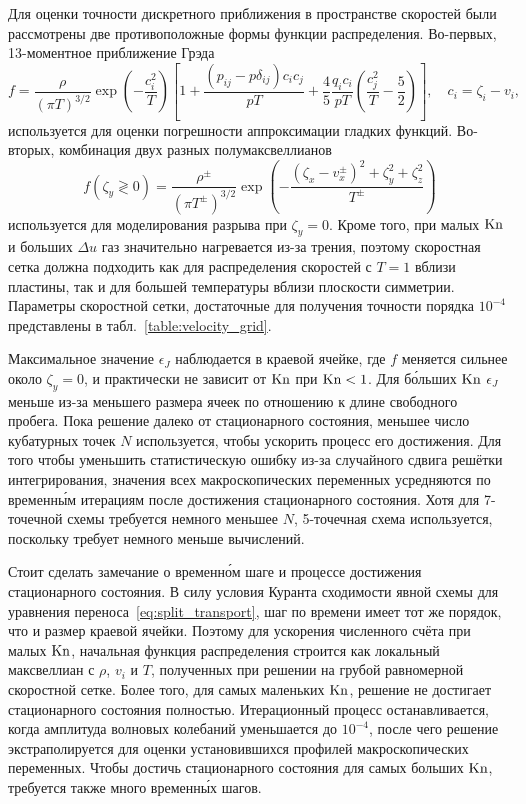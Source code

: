Для оценки точности дискретного приближения в пространстве скоростей
были рассмотрены две противоположные формы функции распределения.
Во-первых, 13-моментное приближение Грэда
\begin{equation}\label{eq:grad13}
    f = \frac{\rho}{(\pi T)^{3/2}}\exp\left(-\frac{c_i^2}{ T}\right)
    \left[ 1 + \frac{(p_{ij}-p\delta_{ij})c_ic_j}{pT} + \frac4{5}\frac{q_ic_i}{pT}\left(\frac{c_j^2}{T}-\frac5{2}\right) \right],
    \quad c_i = \zeta_i - v_i,
\end{equation}
используется для оценки погрешности аппроксимации гладких функций.
Во-вторых, комбинация двух разных полумаксвеллианов
\begin{equation}\label{eq:double_Maxwell}
    f(\zeta_y\gtrless0) = \frac{\rho^\pm}{(\pi T^\pm)^{3/2}}
        \exp\left(-\frac{(\zeta_x-v_x^\pm)^2+\zeta_y^2+\zeta_z^2}{T^\pm}\right)
\end{equation}
используется для моделирования разрыва при \(\zeta_y=0\).
Кроме того, при малых \(\mathrm{Kn}\) и больших \(\Delta{u}\) газ значительно нагревается из-за трения,
поэтому скоростная сетка должна подходить как для распределения скоростей с \(T=1\) вблизи пластины,
так и для большей температуры вблизи плоскости симметрии.
Параметры скоростной сетки, достаточные для получения точности порядка \(10^{-4}\)
представлены в табл.~\ref{table:velocity_grid}.

Максимальное значение \(\epsilon_J\) наблюдается в краевой ячейке,
где \(f\) меняется сильнее около \(\zeta_y = 0\), и практически не зависит от \(\mathrm{Kn}\) при \(\mathrm{Kn}<1\).
Для б\'{о}льших \(\mathrm{Kn}\) \(\epsilon_J\) меньше из-за меньшего размера ячеек по отношению к длине свободного пробега.
Пока решение далеко от стационарного состояния, меньшее число кубатурных точек \(N\) используется,
чтобы ускорить процесс его достижения.
Для того чтобы уменьшить статистическую ошибку из-за случайного сдвига решётки интегрирования,
значения всех макроскопических переменных усредняются по временн\'{ы}м итерациям после достижения стационарного состояния.
Хотя для 7-точечной схемы требуется немного меньшее \(N\),
5-точечная схема используется, поскольку требует немного меньше вычислений.

Стоит сделать замечание о временн\'{о}м шаге и процессе достижения стационарного состояния.
В силу условия Куранта сходимости явной схемы для уравнения переноса~\eqref{eq:split_transport},
шаг по времени имеет тот же порядок, что и размер краевой ячейки.
Поэтому для ускорения численного счёта при малых \(\mathrm{Kn}\),
начальная функция распределения строится как локальный максвеллиан с \(\rho\), \(v_i\) и \(T\),
полученных при решении на грубой равномерной скоростной сетке.
Более того, для самых маленьких \(\mathrm{Kn}\), решение не достигает стационарного состояния полностью.
Итерационный процесс останавливается, когда амплитуда волновых колебаний уменьшается до \(10^{-4}\),
после чего решение экстраполируется для оценки установившихся профилей макроскопических переменных.
Чтобы достичь стационарного состояния для самых больших \(\mathrm{Kn}\), требуется также много временн\'{ы}х шагов.

